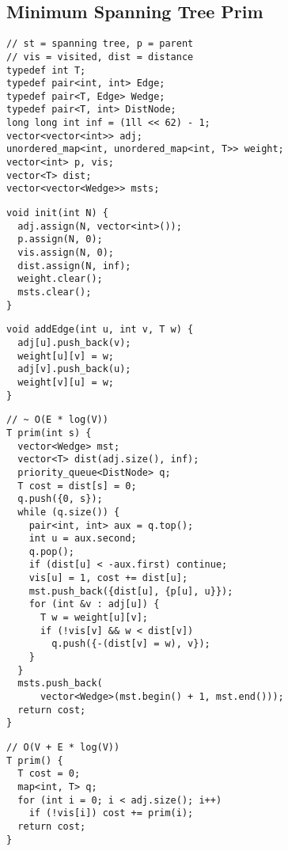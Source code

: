 \documentclass[twoside]{article}
\begin{document}
\begin{multicols*}{2}
\subsection*{Minimum Spanning Tree Prim}
\begin{verbatim}
// st = spanning tree, p = parent
// vis = visited, dist = distance
typedef int T;
typedef pair<int, int> Edge;
typedef pair<T, Edge> Wedge;
typedef pair<T, int> DistNode;
long long int inf = (1ll << 62) - 1;
vector<vector<int>> adj;
unordered_map<int, unordered_map<int, T>> weight;
vector<int> p, vis;
vector<T> dist;
vector<vector<Wedge>> msts;
\end{verbatim}
\vspace{-12pt}
\begin{verbatim}
void init(int N) {
  adj.assign(N, vector<int>());
  p.assign(N, 0);
  vis.assign(N, 0);
  dist.assign(N, inf);
  weight.clear();
  msts.clear();
}
\end{verbatim}
\vspace{-12pt}
\begin{verbatim}
void addEdge(int u, int v, T w) {
  adj[u].push_back(v);
  weight[u][v] = w;
  adj[v].push_back(u);
  weight[v][u] = w;
}
\end{verbatim}
\vspace{-12pt}
\begin{verbatim}
// ~ O(E * log(V))
T prim(int s) {
  vector<Wedge> mst;
  vector<T> dist(adj.size(), inf);
  priority_queue<DistNode> q;
  T cost = dist[s] = 0;
  q.push({0, s});
  while (q.size()) {
    pair<int, int> aux = q.top();
    int u = aux.second;
    q.pop();
    if (dist[u] < -aux.first) continue;
    vis[u] = 1, cost += dist[u];
    mst.push_back({dist[u], {p[u], u}});
    for (int &v : adj[u]) {
      T w = weight[u][v];
      if (!vis[v] && w < dist[v])
        q.push({-(dist[v] = w), v});
    }
  }
  msts.push_back(
      vector<Wedge>(mst.begin() + 1, mst.end()));
  return cost;
}
\end{verbatim}
\vspace{-12pt}
\begin{verbatim}
// O(V + E * log(V))
T prim() {
  T cost = 0;
  map<int, T> q;
  for (int i = 0; i < adj.size(); i++)
    if (!vis[i]) cost += prim(i);
  return cost;
}
\end{verbatim}

\subsectionfont{\large\bfseries\sffamily\underline}

\end{multicols*}
\end{document}

